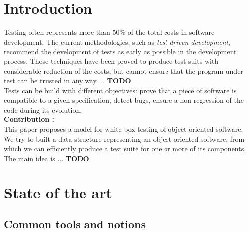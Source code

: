 \documentclass[a4paper]{report}
\begin{document}
\chapter*{Introduction}
Testing often represents more than 50\% of the total costs in software development. The current methodologies, such as \textit{test driven development}, recommend the development of tests as early as possible in the development process. Those techniques have been proved to produce test suits with considerable reduction of the costs, but cannot ensure that the program under test can be trusted in any way ...{\color{red} \textbf{TODO}}\\
Tests can be build with different objectives: prove that a piece of software is compatible to a given specification, detect bugs, ensure a non-regression of the code during its evolution.\\
\newline
\textbf{Contribution :}\\
This paper proposes a model for white box testing of object oriented software. We try to built a data structure representing an object oriented software, from which we can efficiently produce a test suite for one or more of its components. The main idea is ...{\color{red} \textbf{TODO}}\\





\chapter*{State of the art}


\section*{Common tools and notions}
\end{document}

